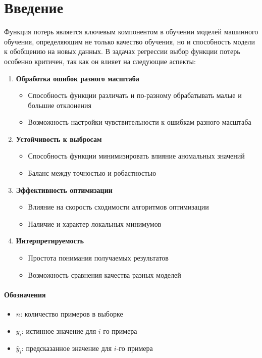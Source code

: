 \section{Введение}

Функция потерь является ключевым компонентом в обучении моделей машинного обучения, определяющим не только качество обучения, но и способность модели к обобщению на новых данных. В задачах регрессии выбор функции потерь особенно критичен, так как он влияет на следующие аспекты:

\begin{enumerate}
    \item \textbf{Обработка ошибок разного масштаба}
    \begin{itemize}
        \item Способность функции различать и по-разному обрабатывать малые и большие отклонения
        \item Возможность настройки чувствительности к ошибкам разного масштаба
    \end{itemize}

    \item \textbf{Устойчивость к выбросам}
    \begin{itemize}
        \item Способность функции минимизировать влияние аномальных значений
        \item Баланс между точностью и робастностью
    \end{itemize}

    \item \textbf{Эффективность оптимизации}
    \begin{itemize}
        \item Влияние на скорость сходимости алгоритмов оптимизации
        \item Наличие и характер локальных минимумов
    \end{itemize}

    \item \textbf{Интерпретируемость}
    \begin{itemize}
        \item Простота понимания получаемых результатов
        \item Возможность сравнения качества разных моделей
    \end{itemize}
\end{enumerate}


\paragraph{Обозначения}
\begin{itemize}
    \item $n$: количество примеров в выборке
    \item $y_i$: истинное значение для $i$-го примера
    \item $\hat{y}_i$: предсказанное значение для $i$-го примера
\end{itemize}

